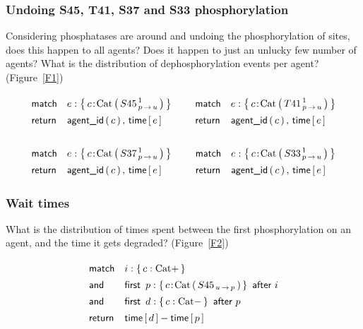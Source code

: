 
\subsubsection*{Undoing S45, T41, S37 and S33 phosphorylation}
Considering phosphatases are around and undoing the phosphorylation of
sites, does this happen to all agents? Does it happen to just an
unlucky few number of agents? What is the distribution of
dephosphorylation events per agent? (Figure~\ref{F1})





\newcommand{\UndoQ}[1]{
\Query{
    \m{match} & e:\Set{ 
      \iAG{c}{\BetaCat}{{#1}^{\,1}_{\Trans{p}{u}}}
    } \\
    \m{return} & \AgentId{c},\, \Time{e}
  }
}

\begin{small}
  \begin{equation*}
    \arraycolsep=7pt
    \begin{array}{cc}
      \UndoQ{S45} & \UndoQ{T41} \\ \\
      \UndoQ{S37} & \UndoQ{S33} \\
    \end{array}
  \end{equation*}
\end{small}


\subsubsection*{Wait times}

What is the distribution of times spent
between the first phosphorylation on an agent, and the time it gets
degraded? (Figure~\ref{F2})


\begin{small}
\begin{equation}
  \Query{
    \m{match} & i:\Set{  c:\BetaCat+ } \\
    \m{and} & \FirstAfter{p:\Set{
        \iAG{c}{\BetaCat}{{S45}_{\Trans{u}{p}}}
    }}{i} \\
    \m{and} & \FirstAfter{ d:\Set{
        c:\BetaCat-
    } }{p} \\
    \m{return} & \Time{d} - \Time{p}
  } 
\end{equation}
\end{small}

